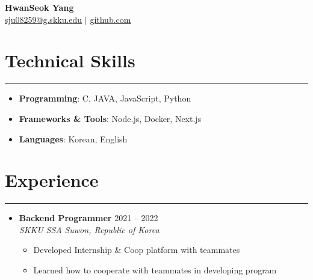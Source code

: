 \documentclass[letterpaper, 10pt]{article}
\begin{document}
\begin{center}
\textbf{\LARGE HwanSeok Yang} \\ \vspace{2pt}
\href{mailto:sju08259@g.skku.edu}{\underline{sju08259@g.skku.edu}} $|$
\href{https://github.com/YangHwanSeok}{\underline{github.com}}
\end{center}
\section*{Technical Skills}
\hrule
\vspace{4pt}
\begin{itemize}
\item[] \textbf{Programming}: C, JAVA, JavaScript, Python%
\item[] \textbf{Frameworks \& Tools}: Node.js, Docker, Next.js%
\item[] \textbf{Languages}: Korean, English%
\end{itemize}
\section*{Experience}
\hrule
\vspace{4pt}
\begin{itemize}
\item[]
\textbf{Backend Programmer} \hfill 2021 -- 2022 \\ %
\textit{SKKU SSA} \hfill \textit{Suwon, Republic of Korea}
\begin{itemize}
\item Developed Internship \& Coop platform with teammates
\item Learned how to cooperate with teammates in developing program
\end{itemize}
\end{itemize}
\end{document}
